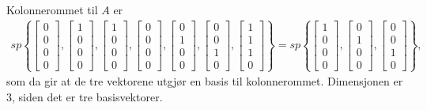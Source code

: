\documentclass[11pt, a4paper, norsk]{NTNUoving}
\begin{document}
\begin{oppgave}
    \begin{punkt}
        Kolonnerommet til $A$ er 
        \begin{align*}
            sp\left\{\begin{bmatrix} 0\\0\\0\\0\end{bmatrix},\begin{bmatrix} 1\\0\\0\\0\end{bmatrix},\begin{bmatrix} 1\\0\\0\\0\end{bmatrix},\begin{bmatrix} 0\\0\\0\\0\end{bmatrix},\begin{bmatrix} 0\\1\\0\\0\end{bmatrix},\begin{bmatrix} 0\\0\\1\\0\end{bmatrix},\begin{bmatrix} 1\\1\\1\\0\end{bmatrix}\right\}=sp\left\{\begin{bmatrix} 1\\0\\0\\0\end{bmatrix},\begin{bmatrix} 0\\1\\0\\0\end{bmatrix},\begin{bmatrix} 0\\0\\1\\0\end{bmatrix}\right\},
        \end{align*}
        som da gir at de tre vektorene utgjør en basis til kolonnerommet. Dimensjonen er 3, siden det er tre basisvektorer.
        

\end{punkt}
\end{oppgave}
\end{document}
